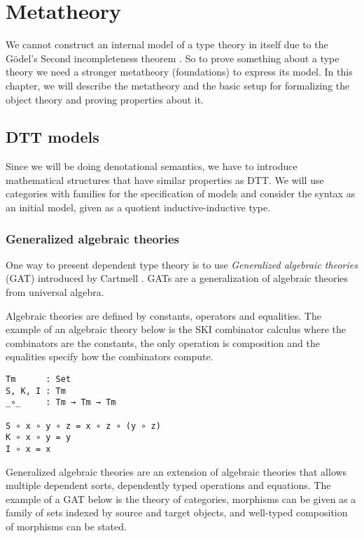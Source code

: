 \chapter{Metatheory}

We cannot construct an internal model of a type theory in itself due to the Gödel's Second incompleteness theorem \cite{godel1931formal}. So to prove something about a type theory we need a stronger metatheory (foundations) to express its model. In this chapter, we will describe the metatheory and the basic setup for formalizing the object theory and proving properties about it.

\section{DTT models}

Since we will be doing denotational semantics, we have to introduce mathematical structures that have similar properties as DTT. We will use categories with families for the specification of models and consider the syntax as an initial model, given as a quotient inductive-inductive type.

\subsection{Generalized algebraic theories}

One way to present dependent type theory is to use \emph{Generalized algebraic theories} (GAT) introduced by Cartmell \cite{cartmell1986generalised}. GATs are a generalization of algebraic theories from universal algebra.

Algebraic theories \cite{whitehead1898treatise} are defined by constants, operators and equalities. The example of an algebraic theory below is the SKI  combinator calculus where the combinators are the constants, the only operation is composition and the equalities specify how the combinators compute.

\begin{verbatim}
Tm      : Set
S, K, I : Tm
_∘_     : Tm → Tm → Tm

S ∘ x ∘ y ∘ z = x ∘ z ∘ (y ∘ z)
K ∘ x ∘ y = y
I ∘ x = x
\end{verbatim}

Generalized algebraic theories are an extension of algebraic theories that allows multiple dependent sorts, dependently typed operations and equations. The example of a GAT below is the theory of categories, morphisms can be given as a family of sets indexed by source and target objects, and well-typed composition of morphisms can be stated.

